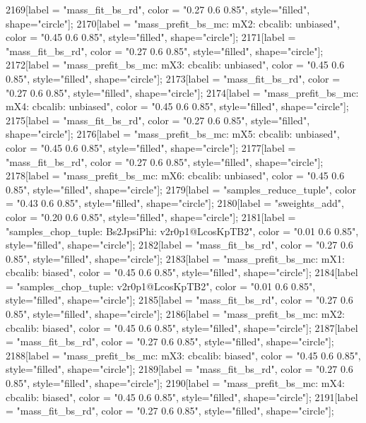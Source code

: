 {	2169[label = "mass_fit_bs_rd", color = "0.27 0.6 0.85", style="filled", shape="circle"];
	2170[label = "mass_prefit_bs_mc\nmassbin: mX2\nmassmodel: cbcalib\ntrigger: unbiased", color = "0.45 0.6 0.85", style="filled", shape="circle"];
	2171[label = "mass_fit_bs_rd", color = "0.27 0.6 0.85", style="filled", shape="circle"];
	2172[label = "mass_prefit_bs_mc\nmassbin: mX3\nmassmodel: cbcalib\ntrigger: unbiased", color = "0.45 0.6 0.85", style="filled", shape="circle"];
	2173[label = "mass_fit_bs_rd", color = "0.27 0.6 0.85", style="filled", shape="circle"];
	2174[label = "mass_prefit_bs_mc\nmassbin: mX4\nmassmodel: cbcalib\ntrigger: unbiased", color = "0.45 0.6 0.85", style="filled", shape="circle"];
	2175[label = "mass_fit_bs_rd", color = "0.27 0.6 0.85", style="filled", shape="circle"];
	2176[label = "mass_prefit_bs_mc\nmassbin: mX5\nmassmodel: cbcalib\ntrigger: unbiased", color = "0.45 0.6 0.85", style="filled", shape="circle"];
	2177[label = "mass_fit_bs_rd", color = "0.27 0.6 0.85", style="filled", shape="circle"];
	2178[label = "mass_prefit_bs_mc\nmassbin: mX6\nmassmodel: cbcalib\ntrigger: unbiased", color = "0.45 0.6 0.85", style="filled", shape="circle"];
	2179[label = "samples_reduce_tuple", color = "0.43 0.6 0.85", style="filled", shape="circle"];
	2180[label = "sweights_add", color = "0.20 0.6 0.85", style="filled", shape="circle"];
	2181[label = "samples_chop_tuple\nmode: Bs2JpsiPhi\nversion: v2r0p1@LcosKpTB2", color = "0.01 0.6 0.85", style="filled", shape="circle"];
	2182[label = "mass_fit_bs_rd", color = "0.27 0.6 0.85", style="filled", shape="circle"];
	2183[label = "mass_prefit_bs_mc\nmassbin: mX1\nmassmodel: cbcalib\ntrigger: biased", color = "0.45 0.6 0.85", style="filled", shape="circle"];
	2184[label = "samples_chop_tuple\nversion: v2r0p1@LcosKpTB2", color = "0.01 0.6 0.85", style="filled", shape="circle"];
	2185[label = "mass_fit_bs_rd", color = "0.27 0.6 0.85", style="filled", shape="circle"];
	2186[label = "mass_prefit_bs_mc\nmassbin: mX2\nmassmodel: cbcalib\ntrigger: biased", color = "0.45 0.6 0.85", style="filled", shape="circle"];
	2187[label = "mass_fit_bs_rd", color = "0.27 0.6 0.85", style="filled", shape="circle"];
	2188[label = "mass_prefit_bs_mc\nmassbin: mX3\nmassmodel: cbcalib\ntrigger: biased", color = "0.45 0.6 0.85", style="filled", shape="circle"];
	2189[label = "mass_fit_bs_rd", color = "0.27 0.6 0.85", style="filled", shape="circle"];
	2190[label = "mass_prefit_bs_mc\nmassbin: mX4\nmassmodel: cbcalib\ntrigger: biased", color = "0.45 0.6 0.85", style="filled", shape="circle"];
	2191[label = "mass_fit_bs_rd", color = "0.27 0.6 0.85", style="filled", shape="circle"];
}
